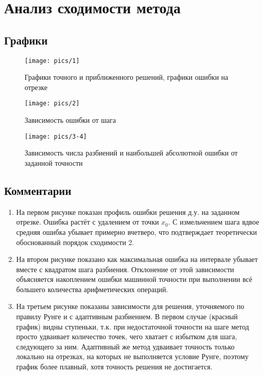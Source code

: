 \section{Анализ сходимости метода}

\subsection{Графики}
\begin{figure}[H]
    \centering
    \caption{Графики точного и приближенного решений, графики ошибки на отрезке}
    \texttt{[image: pics/1]}
    \label{fig:1}
\end{figure}
\begin{figure}[H]
    \centering
    \caption{Зависимость ошибки от шага}
    \texttt{[image: pics/2]}
    \label{fig:1}
\end{figure}
\begin{figure}[H]
    \centering
    \caption{Зависимость числа разбиений и наибольшей абсолютной ошибки от заданной точности}
    \texttt{[image: pics/3-4]}
    \label{fig:1}
\end{figure}

\subsection{Комментарии}

\begin{enumerate}
    \item На первом рисунке показан профиль ошибки решения д.у. на заданном отрезке. Ошибка растёт с удалением от точки $x_0$. С измельчением шага вдвое средняя ошибка убывает примерно вчетверо, что подтверждает теоретически обоснованный порядок сходимости 2.

    \item На втором рисунке показано как максимальная ошибка на интервале убывает вместе с квадратом шага разбиения. Отклонение от этой зависимости объясняется накоплением ошибки машинной точности при выполнении всё большего количества арифметических операций.

    \item На третьем рисунке показаны зависимости для решения, уточняемого по правилу Рунге и с адаптивным разбиением.  В первом случае (красный график) видны ступеньки, т.к. при недостаточной точности на шаге метод просто удваивает количество точек, чего хватает с избытком для шага, следующего за ним. Адаптивный же метод удваивает точность только локально на отрезках, на которых не выполняется условие Рунге, поэтому график более плавный, хотя точность решения не достигается.
\end{enumerate}